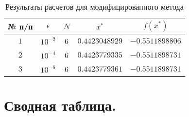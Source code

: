 \begin{table}[h]
    \centering
    \small
    \caption{Результаты расчетов для модифицированного метода}
    \label{tbl:cmp}

    \begin{tabular}{|c|c|c|c|c|}
        \hline
        № п/п & $\epsilon$ & $N$ & $x^*$ & $f(x^*)$ \\\hline
        $1$ & $10^{-2}$ & 6 & $0.4423048929$ & $-0.5511898806$ \\\hline
        $2$ & $10^{-4}$ & 6 & $0.4423779335$ & $-0.5511898731$ \\\hline
        $3$ & $10^{-6}$ & 6 & $0.4423779361$ & $-0.5511898731$ \\\hline
    \end{tabular}
\end{table}


\section{Сводная таблица.}

